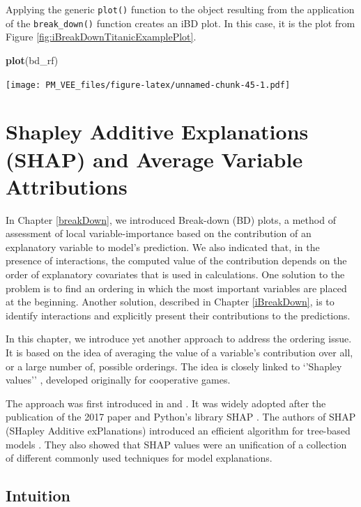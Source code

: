 \documentclass[12pt,]{krantz}
\newenvironment{Shaded}{\begin{snugshade}}{\end{snugshade}}
\newcommand{\KeywordTok}[1]{\textcolor[rgb]{0.13,0.29,0.53}{\textbf{#1}}}
\newcommand{\NormalTok}[1]{#1}
\begin{document}
Applying the generic \texttt{plot()} function to the object resulting from the application of the \texttt{break\_down()} function creates an iBD plot. In this case, it is the plot from Figure \ref{fig:iBreakDownTitanicExamplePlot}.

\begin{Shaded}
\begin{Highlighting}[]
\KeywordTok{plot}\NormalTok{(bd_rf) }
\end{Highlighting}
\end{Shaded}

\texttt{[image: PM\_VEE\_files/figure-latex/unnamed-chunk-45-1.pdf]}

\hypertarget{shapley}{%
\section{Shapley Additive Explanations (SHAP) and Average Variable Attributions}\label{shapley}}

In Chapter \ref{breakDown}, we introduced Break-down (BD) plots, a method of assessment of local variable-importance based on the contribution of an explanatory variable to model's prediction. We also indicated that, in the presence of interactions, the computed value of the contribution depends on the order of explanatory covariates that is used in calculations. One solution to the problem is to find an ordering in which the most important variables are placed at the beginning. Another solution, described in Chapter \ref{iBreakDown}, is to identify interactions and explicitly present their contributions to the predictions.

In this chapter, we introduce yet another approach to address the ordering issue. It is based on the idea of averaging the value of a variable's contribution over all, or a large number of, possible orderings. The idea is closely linked to `'Shapley values'' \citep{shapleybook1952}, developed originally for cooperative games.

The approach was first introduced in \citep{imeJLMR} and \citep{Strumbelj2014}. It was widely adopted after the publication of the 2017 paper \citep{SHAP} and Python's library SHAP \citep{shapPackage}. The authors of SHAP (SHapley Additive exPlanations) introduced an efficient algorithm for tree-based models \citep{TreeSHAP}. They also showed that SHAP values were an unification of a collection of different commonly used techniques for model explanations.

\hypertarget{SHAPIntuition}{%
\subsection{Intuition}\label{SHAPIntuition}}
\end{document}
